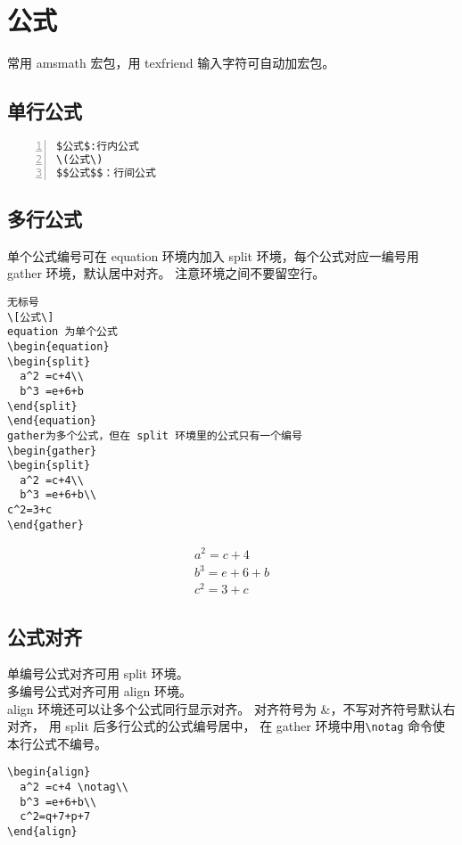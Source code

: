 \section{公式}
常用 amsmath 宏包，用 texfriend 输入字符可自动加宏包。

\subsection{单行公式}
\begin{Verbatim}[formatcom=\color{grass},frame=single,numbers=left]
$公式$:行内公式
\(公式\)
$$公式$$：行间公式
\end{Verbatim}

\subsection{多行公式}
单个公式编号可在 equation 环境内加入 split 环境，每个公式对应一编号用 gather 环境，默认居中对齐。
\textcolor[rgb]{1.00,0.00,0.00}{注意环境之间不要留空行。}
\begin{Verbatim}[formatcom=\color{grass},frame=single]
无标号
\[公式\]
equation 为单个公式
\begin{equation}
\begin{split}
  a^2 =c+4\\
  b^3 =e+6+b
\end{split}
\end{equation}
gather为多个公式，但在 split 环境里的公式只有一个编号
\begin{gather}
\begin{split}
  a^2 =c+4\\
  b^3 =e+6+b\\
c^2=3+c
\end{gather}
\end{Verbatim}

\begin{gather}
  a^2 =c+4\\
  b^3 =e+6+b\\
c^2=3+c
\end{gather}

\subsection{公式对齐}

单编号公式对齐可用 split 环境。\\
多编号公式对齐可用 align 环境。\\
align 环境还可以让多个公式同行显示对齐。
对齐符号为 \&，不写对齐符号默认右对齐，
用 split 后多行公式的公式编号居中，
在 gather 环境中用\verb$\notag$ 命令使本行公式不编号。
\begin{Verbatim}[formatcom=\color{grass},frame=single]
\begin{align}
  a^2 =c+4 \notag\\
  b^3 =e+6+b\\
  c^2=q+7+p+7
\end{align}
\end{Verbatim}

